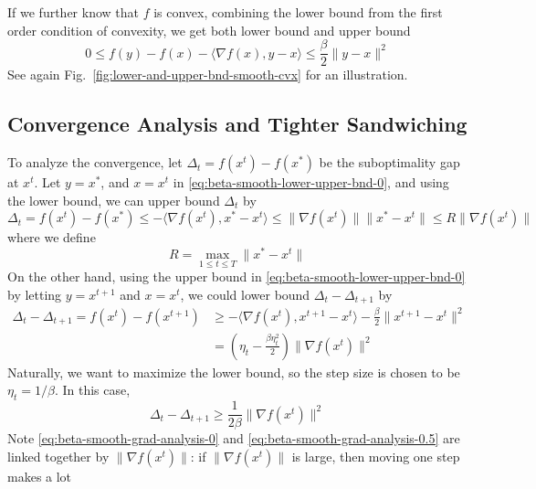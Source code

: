 \documentclass{scrartcl}
\begin{document}
If we further know that $f$ is convex, combining the lower bound from the first order condition of
convexity, we get both lower bound and upper bound
\begin{equation}
  0 \leq f(y) - f(x) - \langle \nabla f(x), y-x\rangle \leq \frac{\beta}{2}\|y-x\|^2
  \label{eq:beta-smooth-lower-upper-bnd-0}
\end{equation}
See again Fig.~\ref{fig:lower-and-upper-bnd-smooth-cvx} for an illustration.

\subsection{Convergence Analysis and Tighter Sandwiching}

To analyze the convergence, let $\Delta_t=f(x^t)-f(x^*)$ be the suboptimality gap at $x^t$. Let
$y=x^*$, and $x=x^t$ in \eqref{eq:beta-smooth-lower-upper-bnd-0}, and using the lower bound, we can
upper bound $\Delta_t$ by
\begin{equation}
  \Delta_t = f(x^t)-f(x^*) \leq -\langle \nabla f(x^t), x^*-x^t\rangle
  \leq \|\nabla f(x^t)\|\|x^*-x^t\| \leq R\|\nabla f(x^t)\|
  \label{eq:beta-smooth-grad-analysis-0}
\end{equation}
where we define
\begin{equation}
  R=\max_{1\leq t\leq T}\|x^*-x^t\|
\end{equation}
On the other hand, using the upper bound in \eqref{eq:beta-smooth-lower-upper-bnd-0} by letting
$y=x^{t+1}$ and $x=x^t$, we could lower bound $\Delta_t-\Delta_{t+1}$ by
\begin{equation*}
\begin{aligned}
  \Delta_t-\Delta_{t+1} = f(x^t)-f(x^{t+1})
  &\geq -\langle \nabla f(x^t), x^{t+1}-x^t\rangle - \frac{\beta}{2}\|x^{t+1}-x^t\|^2 \\
  &= \left(\eta_t - \frac{\beta\eta_t^2}{2}\right) \|\nabla f(x^t)\|^2
\end{aligned}
\end{equation*}
Naturally, we want to maximize the lower bound, so the step size is chosen to be
$\eta_t = 1/\beta$. In this case,
\begin{equation}
  \Delta_t - \Delta_{t+1} \geq \frac{1}{2\beta}\|\nabla f(x^t)\|^2
  \label{eq:beta-smooth-grad-analysis-0.5}
\end{equation}
Note \eqref{eq:beta-smooth-grad-analysis-0} and \eqref{eq:beta-smooth-grad-analysis-0.5} are linked
together by $\|\nabla f(x^t)\|$: if $\|\nabla f(x^t)\|$ is large, then moving one step makes a lot
\end{document}
